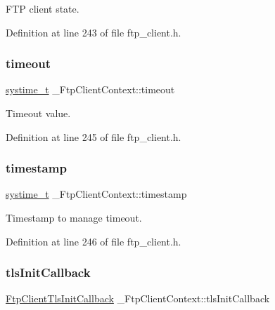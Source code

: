 F\+TP client state. 



Definition at line 243 of file ftp\+\_\+client.\+h.

\mbox{\label{struct__FtpClientContext_a5999107428b02a4b86b5e9cb30e75e32}} 
\subsubsection{\texorpdfstring{timeout}{timeout}}
{\footnotesize\ttfamily \hyperlink{compiler__port_8h_ae3e32a98d431a02106616da3071832dd}{systime\+\_\+t} \+\_\+\+Ftp\+Client\+Context\+::timeout}



Timeout value. 



Definition at line 245 of file ftp\+\_\+client.\+h.

\mbox{\label{struct__FtpClientContext_aae36f0f77b41cc5fd7e82000bd18f6d1}} 
\subsubsection{\texorpdfstring{timestamp}{timestamp}}
{\footnotesize\ttfamily \hyperlink{compiler__port_8h_ae3e32a98d431a02106616da3071832dd}{systime\+\_\+t} \+\_\+\+Ftp\+Client\+Context\+::timestamp}



Timestamp to manage timeout. 



Definition at line 246 of file ftp\+\_\+client.\+h.

\mbox{\label{struct__FtpClientContext_a7f68e28657aa3d2d5383dfb7e7690e1c}} 
\subsubsection{\texorpdfstring{tls\+Init\+Callback}{tlsInitCallback}}
{\footnotesize\ttfamily \hyperlink{ftp__client_8h_ad03bcd2ffc64881b3f7c0aaa09b14535}{Ftp\+Client\+Tls\+Init\+Callback} \+\_\+\+Ftp\+Client\+Context\+::tls\+Init\+Callback}



